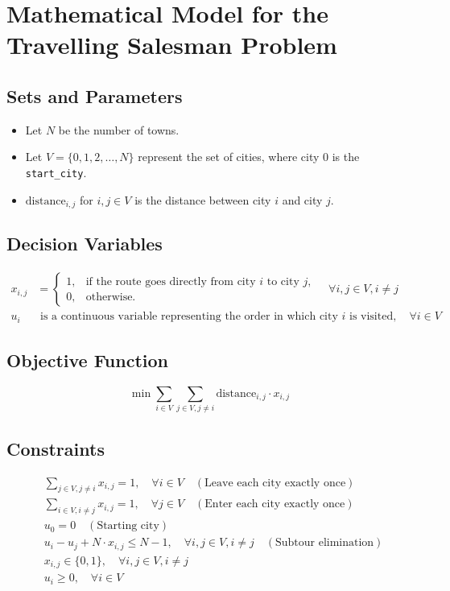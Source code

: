 \documentclass{article}
\begin{document}
\section*{Mathematical Model for the Travelling Salesman Problem}

\subsection*{Sets and Parameters}

\begin{itemize}
    \item Let \( N \) be the number of towns.
    \item Let \( V = \{0, 1, 2, \ldots, N\} \) represent the set of cities, where city 0 is the \texttt{start\_city}.
    \item \( \text{distance}_{i,j} \) for \( i, j \in V \) is the distance between city \( i \) and city \( j \).
\end{itemize}

\subsection*{Decision Variables}

\begin{align*}
    x_{i,j} &=
    \begin{cases} 
      1, & \text{if the route goes directly from city } i \text{ to city } j, \\
      0, & \text{otherwise.}
    \end{cases} \quad \forall i, j \in V, i \neq j \\
    u_i & \text{ is a continuous variable representing the order in which city } i \text{ is visited}, \quad \forall i \in V
\end{align*}

\subsection*{Objective Function}

\[
\min \sum_{i \in V} \sum_{j \in V, j \neq i} \text{distance}_{i,j} \cdot x_{i,j}
\]

\subsection*{Constraints}

\begin{align}
    &\sum_{j \in V, j \neq i} x_{i,j} = 1, \quad \forall i \in V \quad (\text{Leave each city exactly once}) \\
    &\sum_{i \in V, i \neq j} x_{i,j} = 1, \quad \forall j \in V \quad (\text{Enter each city exactly once}) \\
    &u_0 = 0 \quad (\text{Starting city}) \\
    &u_i - u_j + N \cdot x_{i,j} \leq N - 1, \quad \forall i, j \in V, i \neq j \quad (\text{Subtour elimination}) \\
    &x_{i,j} \in \{0, 1\}, \quad \forall i, j \in V, i \neq j \\
    &u_i \geq 0, \quad \forall i \in V
\end{align}
\end{document}
